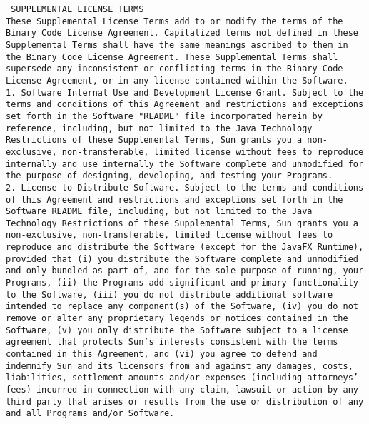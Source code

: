 \setlength{\baselineskip}{0.5\oldbaselineskip}
{\tiny\tt
\noindent
SUPPLEMENTAL LICENSE TERMS
\\[4pt]
These Supplemental License Terms add to or modify the terms of the
Binary Code License Agreement. Capitalized terms not defined in these
Supplemental Terms shall have the same meanings ascribed to them in
the Binary Code License Agreement. These Supplemental Terms shall
supersede any inconsistent or conflicting terms in the Binary Code
License Agreement, or in any license contained within the Software.
\\[4pt]
   1. Software Internal Use and Development License Grant. Subject to
   the terms and conditions of this Agreement and restrictions and
   exceptions set forth in the Software "README" file incorporated
   herein by reference, including, but not limited to the Java
   Technology Restrictions of these Supplemental Terms, Sun grants you
   a non-exclusive, non-transferable, limited license without fees to
   reproduce internally and use internally the Software complete and
   unmodified for the purpose of designing, developing, and testing
   your Programs.
\\[4pt]
   2. License to Distribute Software. Subject to the terms and
   conditions of this Agreement and restrictions and exceptions set
   forth in the Software README file, including, but not limited to
   the Java Technology Restrictions of these Supplemental Terms, Sun
   grants you a non-exclusive, non-transferable, limited license
   without fees to reproduce and distribute the Software (except for
   the JavaFX Runtime), provided that (i) you distribute the Software
   complete and unmodified and only bundled as part of, and for the
   sole purpose of running, your Programs, (ii) the Programs add
   significant and primary functionality to the Software, (iii) you do
   not distribute additional software intended to replace any
   component(s) of the Software, (iv) you do not remove or alter any
   proprietary legends or notices contained in the Software, (v) you
   only distribute the Software subject to a license agreement that
   protects Sun's interests consistent with the terms contained in
   this Agreement, and (vi) you agree to defend and indemnify Sun and
   its licensors from and against any damages, costs, liabilities,
   settlement amounts and/or expenses (including attorneys' fees)
   incurred in connection with any claim, lawsuit or action by any
   third party that arises or results from the use or distribution of
   any and all Programs and/or Software.
\\[4pt]
}

